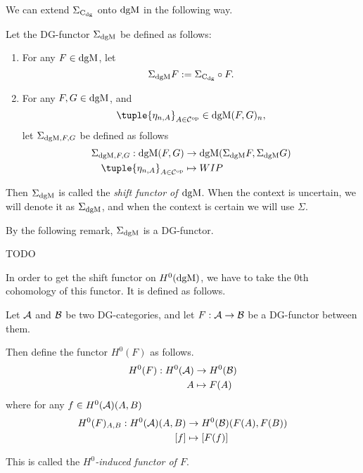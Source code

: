 We can extend \( \Sigma_{\operatorname{C}_{\operatorname{dg}}} \) onto \( \operatorname{dgM} \) in the following way.

\begin{definition}
    \label{def:sigma_dgmod}
    Let the DG-functor \( \Sigma_{\operatorname{dgM}} \) be defined as follows:
    \begin{enumerate}
        \item {
            For any \( F \in \operatorname{dgM} \), let
            \[
                \Sigma_{\operatorname{dgM}} F := \Sigma_{\operatorname{C}_{\operatorname{dg}}} \circ F.
            \]
        }
        \item {
            For any \( F, G \in \operatorname{dgM} \), and
            \[
                \tuple{\eta_{n, A}}_{A \in \Cc^{\op}} \in \dgM(F, G)_n,
            \]
            let \( \Sigma_{\operatorname{dgM}, F, G} \) be defined as follows
            \begin{align*}
                \Sigma_{\dgM, F, G}: \dgM(F, G) &\to \dgM(\Sigma_{\dgM} F, \Sigma_{\dgM} G) \\
                \tuple{\eta_{n, A}}_{A \in \Cc^{\op}} &\mapsto WIP
            \end{align*}
        }
    \end{enumerate}
    Then \( \Sigma_{\operatorname{dgM}} \) is called the \emph{shift functor of \( \operatorname{dgM} \)}. When the context is uncertain, we will denote it as \( \Sigma_{\operatorname{dgM}} \), and when the context is certain we will use \( \Sigma \).
\end{definition}

By the following remark, \( \Sigma_{\operatorname{dgM}} \) is a DG-functor.

\begin{remark}
    TODO
\end{remark}

In order to get the shift functor on \( H^0(\operatorname{dgM}) \), we have to take the \( 0 \)th cohomology of this functor. It is defined as follows.

\begin{definition}
    \label{def:H^0-induced_functor}
    Let \( {\mathcal{A}} \) and \( {\mathcal{B}} \) be two DG-categories, and let \( F: {\mathcal{A}} \to {\mathcal{B}} \) be a DG-functor between them.

    Then define the functor \( H^0(F) \) as follows.
    \begin{align*}
        H^0(F): H^0({\mathcal{A}}) &\to H^0({\mathcal{B}}) \\
        A &\mapsto F(A)
    \end{align*}
    where for any \( f \in H^0({\mathcal{A}})(A, B) \)
    \begin{align*}
        H^0(F)_{A, B}: H^0({\mathcal{A}})(A, B) &\to H^0({\mathcal{B}})(F(A), F(B)) \\
        [f] &\mapsto [F(f)]
    \end{align*}

    This is called the \emph{\( H^0 \)-induced functor of \( F \)}.
\end{definition}


